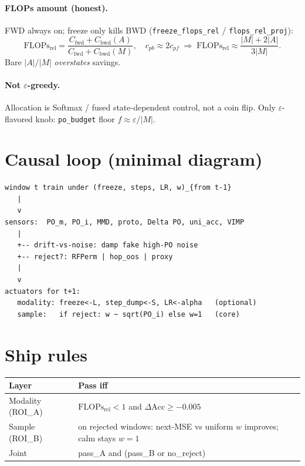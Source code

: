 \documentclass[11pt]{article}
\newcommand{\Flops}{\mathrm{FLOPs}_{\mathrm{rel}}}
\newcommand{\Acc}{\mathrm{Acc}}
\begin{document}
\paragraph{FLOPs amount (honest).}
FWD always on; freeze only kills BWD
(\texttt{freeze\_flops\_rel} / \texttt{flops\_rel\_proj}):
\[
\Flops
=
\frac{C_{\mathrm{fwd}}+C_{\mathrm{bwd}}(A)}{C_{\mathrm{fwd}}+C_{\mathrm{bwd}}(M)},
\quad
c_{pb}\approx 2c_{pf}
\;\Rightarrow\;
\Flops\approx\frac{|M|+2|A|}{3|M|}.
\]
Bare $|A|/|M|$ \emph{overstates} savings.

\paragraph{Not $\varepsilon$-greedy.}
Allocation is Softmax / fused state-dependent control, not a coin flip.
Only $\varepsilon$-flavored knob: \texttt{po\_budget} floor
$f\approx\varepsilon/|M|$.

\section{Causal loop (minimal diagram)}
\label{sec:loop}

\begin{verbatim}
window t train under (freeze, steps, LR, w)_{from t-1}
   |
   v
sensors:  PO_m, PO_i, MMD, proto, Delta PO, uni_acc, VIMP
   |
   +-- drift-vs-noise: damp fake high-PO noise
   +-- reject?: RFPerm | hop_oos | proxy
   |
   v
actuators for t+1:
   modality: freeze<-L, step_dump<-S, LR<-alpha   (optional)
   sample:   if reject: w ~ sqrt(PO_i) else w=1   (core)
\end{verbatim}

\section{Ship rules}
\label{sec:ship}

\begin{center}
\small
\begin{tabular}{@{}ll@{}}
\toprule
Layer & Pass iff \\
\midrule
Modality (ROI\_A)
  & $\Flops<1$ and $\Delta\Acc\ge-0.005$ \\
Sample (ROI\_B)
  & on rejected windows: next-MSE vs uniform $w$ improves;
    calm stays $w=1$ \\
Joint
  & pass\_A and (pass\_B or no\_reject) \\
\bottomrule
\end{tabular}
\end{center}
\end{document}
